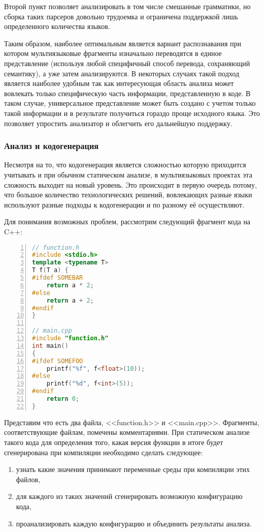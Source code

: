Второй пункт позволяет анализировать в том числе смешанные грамматики, 
но сборка таких парсеров довольно трудоемка и ограничена поддержкой лишь определенного количества языков.

Таким образом, наиболее оптимальным является вариант распознавания при котором мультиязыковые фрагменты
изначально переводятся в единое представление (используя любой специфичный способ перевода, сохраняющий семантику), а
уже затем анализируются. В некоторых случаях такой подход является наиболее удобным так как
интересующая область анализа может вовлекать только специфическую часть информации, представленную в коде.
В таком случае, универсальное представление может быть создано с учетом только такой информации и
в результате получиться гораздо проще исходного языка. Это позволяет упростить анализатор и облегчить его
дальнейшую поддержку.

\subsubsection{Анализ и кодогенерация}

Несмотря на то, что кодогенерация является сложностью которую приходится учитывать и при обычном
статическом анализе, в мультиязыковых проектах эта сложность выходит на новый уровень.
Это происходит в первую очередь потому, что большое количество технологических решений, вовлекающих
разные языки используют разные подходы к кодогенерации и по разному её осуществляют.

Для понимания возможных проблем, рассмотрим следующий фрагмент кода на C++:
\begin{lstlisting}[numbers=left, language=C++]
// function.h
#include <stdio.h>
template <typename T>
T f(T a) {
#ifdef SOMEBAR
    return a * 2;
#else
    return a + 2;
#endif
}

// main.cpp
#include "function.h"
int main()
{
#ifdef SOMEFOO
    printf("%f", f<float>(10));
#else
    printf("%d", f<int>(5));
#endif
    return 0;
}
\end{lstlisting}

Представим что есть два файла, <<function.h>> и <<main.cpp>>. Фрагменты, соответствующие файлам, помечены
комментариями. При статическом анализе такого кода для определения того, какая версия функции в итоге будет
сгенерирована при компиляции необходимо сделать следующее:
\begin{enumerate}[label=\arabic*.]
    \item узнать какие значения принимают переменные среды при компиляции этих файлов,
    \item для каждого из таких значений сгенерировать возможную конфигурацию кода,
    \item проанализировать каждую конфигурацию и объединить результаты анализа.
\end{enumerate}

